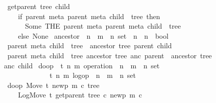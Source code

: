 \documentclass[sigconf]{acmart}
\renewcommand{\isacartoucheopen}{}
\renewcommand{\isacartoucheclose}{}
\begin{document}
\begin{figure}
\begin{isabellebody}
\ \ {\isacartoucheopen}get{\isacharunderscore}parent\ tree\ child\ {\isasymequiv}\isanewline
\ \ \ \ \ if\ {\isasymexists}{\isacharbang}parent{\isachardot}\ {\isasymexists}{\isacharbang}meta{\isachardot}\ {\isacharparenleft}parent{\isacharcomma}\ meta{\isacharcomma}\ child{\isacharparenright}\ {\isasymin}\ tree\ then\isanewline
\ \ \ \ \ \ \ Some\ {\isacharparenleft}THE\ {\isacharparenleft}parent{\isacharcomma}\ meta{\isacharparenright}{\isachardot}\ {\isacharparenleft}parent{\isacharcomma}\ meta{\isacharcomma}\ child{\isacharparenright}\ {\isasymin}\ tree{\isacharparenright}\isanewline
\ \ \ \ \ else\ None{\isacartoucheclose}\isanewline
\isanewline
{}\isamarkupfalse%
\ ancestor\ {\isacharcolon}{\isacharcolon}\ {\isacartoucheopen}{\isacharparenleft}{\isacharprime}n\ {\isasymtimes}\ {\isacharprime}m\ {\isasymtimes}\ {\isacharprime}n{\isacharparenright}\ set\ {\isasymRightarrow}\ {\isacharprime}n\ {\isasymRightarrow}\ {\isacharprime}n\ {\isasymRightarrow}\ bool{\isacartoucheclose}\ \isanewline
\ \ {\isacartoucheopen}{\isasymlbrakk}{\isacharparenleft}parent{\isacharcomma}\ meta{\isacharcomma}\ child{\isacharparenright}\ {\isasymin}\ tree{\isasymrbrakk}\ {\isasymLongrightarrow}\ ancestor\ tree\ parent\ child{\isacartoucheclose}\ {\isacharbar}\isanewline
\ \ {\isacartoucheopen}{\isasymlbrakk}{\isacharparenleft}parent{\isacharcomma}\ meta{\isacharcomma}\ child{\isacharparenright}\ {\isasymin}\ tree{\isacharsemicolon}\ ancestor\ tree\ anc\ parent{\isasymrbrakk}\ {\isasymLongrightarrow}\ ancestor\ tree\ anc\ child{\isacartoucheclose}\isanewline
\isanewline
{}\isamarkupfalse%
\ do{\isacharunderscore}op\ {\isacharcolon}{\isacharcolon}\ {\isacartoucheopen}{\isacharparenleft}{\isacharprime}t{\isacharcomma}\ {\isacharprime}n{\isacharcomma}\ {\isacharprime}m{\isacharparenright}\ operation\ {\isasymtimes}\ {\isacharparenleft}{\isacharprime}n\ {\isasymtimes}\ {\isacharprime}m\ {\isasymtimes}\ {\isacharprime}n{\isacharparenright}\ set\ {\isasymRightarrow}\isanewline
\ \ \ \ \ \ \ \ \ \ \ \ \ \ {\isacharparenleft}{\isacharprime}t{\isacharcomma}\ {\isacharprime}n{\isacharcomma}\ {\isacharprime}m{\isacharparenright}\ log{\isacharunderscore}op\ {\isasymtimes}\ {\isacharparenleft}{\isacharprime}n\ {\isasymtimes}\ {\isacharprime}m\ {\isasymtimes}\ {\isacharprime}n{\isacharparenright}\ set{\isacartoucheclose}\ \isanewline
\ \ {\isacartoucheopen}do{\isacharunderscore}op\ {\isacharparenleft}Move\ t\ newp\ m\ c{\isacharcomma}\ tree{\isacharparenright}\ {\isacharequal}\isanewline
\ \ \ \ \ {\isacharparenleft}LogMove\ t\ {\isacharparenleft}get{\isacharunderscore}parent\ tree\ c{\isacharparenright}\ newp\ m\ c{\isacharcomma}\isanewline

\end{isabellebody}
\end{figure}
\end{document}
